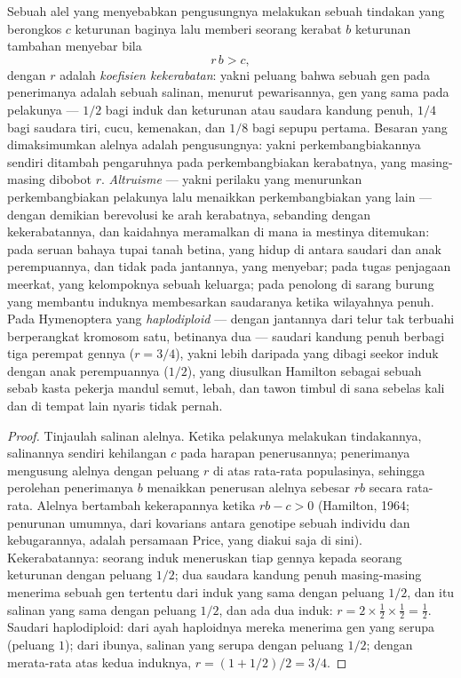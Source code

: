 \begin{theorem}\label{thm:b3:behavioural-ecology:hamilton}
%
Sebuah alel yang menyebabkan pengusungnya melakukan sebuah tindakan yang berongkos $c$
keturunan baginya lalu memberi seorang kerabat $b$ keturunan tambahan menyebar bila
\[
r\,b > c ,
\]
dengan $r$ adalah \emph{koefisien kekerabatan}: yakni peluang
bahwa sebuah gen pada penerimanya adalah sebuah salinan, menurut pewarisannya, gen yang sama pada
pelakunya --- $1/2$ bagi induk dan keturunan atau saudara kandung penuh, $1/4$
bagi saudara tiri, cucu, kemenakan, dan $1/8$ bagi sepupu
pertama. Besaran yang dimaksimumkan alelnya adalah \emph{}
pengusungnya: yakni perkembangbiakannya sendiri ditambah pengaruhnya pada
perkembangbiakan kerabatnya, yang masing-masing dibobot $r$. \emph{Altruisme} ---
yakni perilaku yang menurunkan perkembangbiakan pelakunya lalu menaikkan perkembangbiakan yang lain
--- dengan demikian berevolusi ke arah kerabatnya, sebanding dengan kekerabatannya, dan
kaidahnya meramalkan di mana ia mestinya ditemukan: pada seruan bahaya tupai
tanah betina, yang hidup di antara saudari dan anak perempuannya, dan tidak
pada jantannya, yang menyebar; pada tugas penjagaan meerkat, yang
kelompoknya sebuah keluarga; pada penolong di sarang burung yang membantu
induknya membesarkan saudaranya ketika wilayahnya penuh. Pada
Hymenoptera yang \emph{haplodiploid} --- dengan jantannya dari telur tak terbuahi berperangkat
kromosom satu, betinanya dua --- saudari kandung penuh berbagi tiga
perempat gennya ($r = 3/4$), yakni lebih daripada yang dibagi seekor induk dengan
anak perempuannya ($1/2$), yang diusulkan Hamilton sebagai sebuah sebab kasta pekerja
mandul semut, lebah, dan tawon timbul di sana sebelas kali dan
di tempat lain nyaris tidak pernah.
\end{theorem}
\begin{proof}
Tinjaulah salinan alelnya. Ketika pelakunya melakukan tindakannya, salinannya
sendiri kehilangan $c$ pada harapan penerusannya; penerimanya mengusung
alelnya dengan peluang $r$ di atas rata-rata populasinya, sehingga
perolehan penerimanya $b$ menaikkan penerusan alelnya sebesar $rb$ secara
rata-rata. Alelnya bertambah kekerapannya ketika $rb - c > 0$ (Hamilton,
1964; penurunan umumnya, dari kovarians antara genotipe sebuah
individu dan kebugarannya, adalah persamaan Price, yang diakui saja
di sini). Kekerabatannya: seorang induk meneruskan tiap gennya kepada seorang keturunan dengan
peluang $1/2$; dua saudara kandung penuh masing-masing menerima sebuah gen tertentu dari
induk yang sama dengan peluang $1/2$, dan itu salinan yang sama dengan
peluang $1/2$, dan ada dua induk: $r = 2\times\tfrac{1}{2}
\times\tfrac{1}{2} = \tfrac{1}{2}$. Saudari haplodiploid: dari ayah
haploidnya mereka menerima gen yang serupa (peluang $1$); dari
ibunya, salinan yang serupa dengan peluang $1/2$; dengan merata-rata atas
kedua induknya, $r = (1 + 1/2)/2 = 3/4$.
\end{proof}

